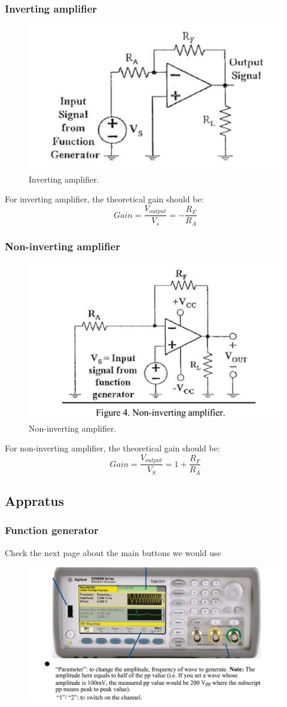 \documentclass{article}
\begin{document}
\subsubsection{Inverting amplifier}
\begin{figure}
	\centering
	\includegraphics[width=0.7\linewidth]{pic3}
	\caption{ Inverting amplifier.}
	\label{fig:pic3}
\end{figure}
For inverting amplifier, the theoretical gain should be:
$$Gain=\frac{V_{output}}{V_s}=-\frac{R_F}{R_A}$$
\subsubsection{Non-inverting amplifier}
\begin{figure}[H]
	\centering
	\includegraphics[width=0.7\linewidth]{pic4}
	\caption{Non-inverting amplifier.}
	\label{fig:pic4}
\end{figure}
For non-inverting amplifier, the theoretical gain should be:
$$Gain=\frac{V_{output}}{V_S}=1+\frac{R_F}{R_A}$$
\subsection{Appratus}
\subsubsection{Function generator}
Check the next page about the main buttons we would use
\begin{figure}[H]
	\centering
	\includegraphics[width=0.7\linewidth]{pic5}
	\label{fig:pic5}
\end{figure}
\end{document}
